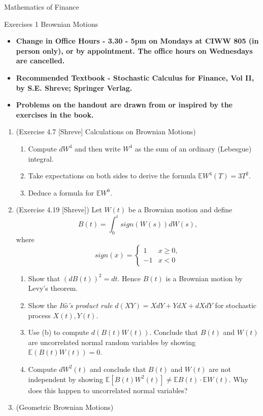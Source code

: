 \documentclass{article}
\begin{document}
{\bf \centerline{\Large Mathematics of Finance }}
\vskip0.25cm
{\bf \centerline{\Large Exercises 1 \quad Brownian Motions}}
\vskip0.25cm

\begin{itemize}
\item {\bf Change in Office Hours - 3.30 - 5pm on Mondays at CIWW 805 (in person only), or by appointment. The office hours on Wednesdays are cancelled.}
\item {\bf Recommended Textbook - Stochastic Calculus for Finance, Vol II, by S.E. Shreve; Springer Verlag. }
\item {\bf Problems on the handout are drawn from or inspired by the exercises in the book.} 
\end{itemize}

\begin{enumerate}
\item (Exercise 4.7 [Shreve] Calculations on Brownian Motions)
\begin{enumerate}
\item Compute $dW^4$ and then write $W^4$ as the sum of an ordinary (Lebesgue) integral.
\item Take expectations on both sides to derive the formula $\mathbb EW^4(T)=3T^2$.
\item Deduce a formula for $\mathbb EW^6$.
\end{enumerate}
\item (Exercise 4.19 [Shreve]) Let $W(t)$ be a Brownian motion and define
\[
B(t)=\int_0^t sign(W(s))dW(s),
\]
where 
\[
sign(x)=\begin{cases} 1 & x\geq0, \\ -1 & x<0 \end{cases}
\]
\begin{enumerate}
\item Show that $(dB(t))^2=dt$. Hence $B(t)$ is a Brownian motion by Levy's theorem.
\item Show the \emph{It$\hat o$'s product rule} $d(XY)=XdY+YdX+dXdY$ for stochastic process $X(t), Y(t)$. 
\item Use (b) to compute $d(B(t)W(t))$. Conclude that $B(t)$ and $W(t)$ are uncorrelated normal random variables by showing $\mathbb E(B(t)W(t))=0$. 
\item Compute $dW^2(t)$ and conclude that $B(t)$ and $W(t)$ are not independent by showing $\mathbb E[B(t)W^2(t)] \neq \mathbb EB(t)\cdot \mathbb EW(t)$. Why does this happen to uncorrelated normal variables?
\end{enumerate}
\item (Geometric Brownian Motions)

\end{enumerate}
\end{document}
